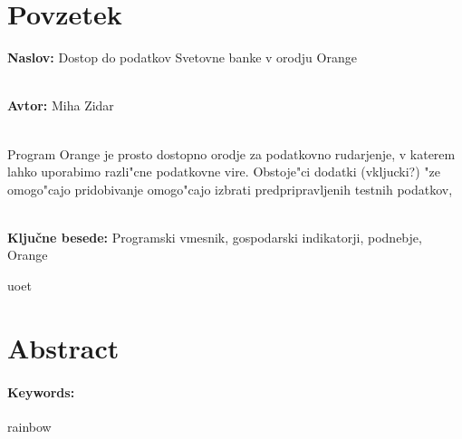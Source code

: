 \chapter*{Povzetek}



\textbf{Naslov:} Dostop do podatkov Svetovne banke v orodju Orange

\ \\
\textbf{Avtor:} Miha Zidar

\ \\
Program Orange je prosto dostopno orodje za podatkovno rudarjenje, v katerem
lahko uporabimo razli"cne podatkovne vire. Obstoje"ci dodatki (vkljucki?) "ze
omogo"cajo pridobivanje 
omogo"cajo izbrati predpripravljenih testnih podatkov, 

\ \\
\textbf{Ključne besede:} Programski vmesnik, gospodarski indikatorji, podnebje,
Orange



uoet


\clearemptydoublepage

\chapter*{Abstract}



\subsubsection*{Keywords:}

rainbow

